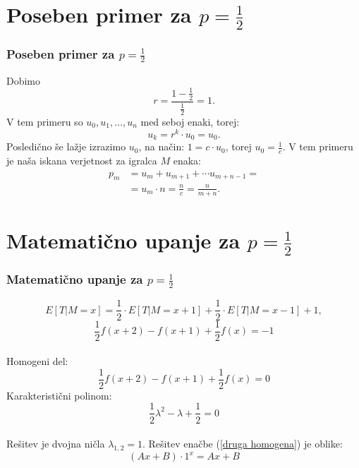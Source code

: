 \documentclass[10pt]{beamer}
\begin{document}
\section[Poseben primer za $p = \frac{1}{2}$]{Poseben primer za $p = \frac{1}{2}$}
\begin{frame}
\frametitle{Poseben primer za $p = \frac{1}{2}$}
Dobimo $$r = \frac{1 - \frac{1}{2}}{\frac{1}{2}} = 1.$$
V tem primeru so $u_0, u_1, \dotso, u_n$ med seboj enaki, torej:
$$u_k = r^k \cdot u_0 = u_0.$$
Posledično še lažje izrazimo $u_0$, na način:
$1 = c\cdot u_0$, torej $u_0 = \frac{1}{c}.$
V tem primeru je naša iskana verjetnost za igralca $M$ enaka:
\begin{equation*}
\begin{split}
p_m &= u_m + u_{m+1} + \cdots u_{m+n-1} = \\
		&= u_m \cdot n = \frac{n}{c} = \frac{n}{m + n}.
\end{split} 
\end{equation*}
\end{frame}

\section[Matematično upanje za $p = \frac{1}{2}$]{Matematično upanje za $p = \frac{1}{2}$}
\begin{frame}
\frametitle{Matematično upanje za $p = \frac{1}{2}$}
$$E[T|M=x] = \frac{1}{2}\cdot E[T|M=x+1] + \frac{1}{2}\cdot E[T|M=x-1] + 1,$$
\begin{equation}
\label{druga rekurzivna}
\frac{1}{2}f(x+2)-f(x+1)+\frac{1}{2}f(x)=-1
\end{equation}\\
Homogeni del:\\
\begin{equation}
\label{druga homogena}
\frac{1}{2}f(x+2)-f(x+1)+\frac{1}{2}f(x)=0
\end{equation}
Karakteristični polinom:
$$\frac{1}{2}\lambda^2-\lambda+\frac{1}{2}=0$$ \\
Rešitev je dvojna ničla $\lambda_{1, 2}= 1$. Rešitev enačbe (\ref{druga homogena}) je oblike:\\ $$(Ax+B)\cdot 1^x=Ax+B$$
\end{frame}
\end{document}
